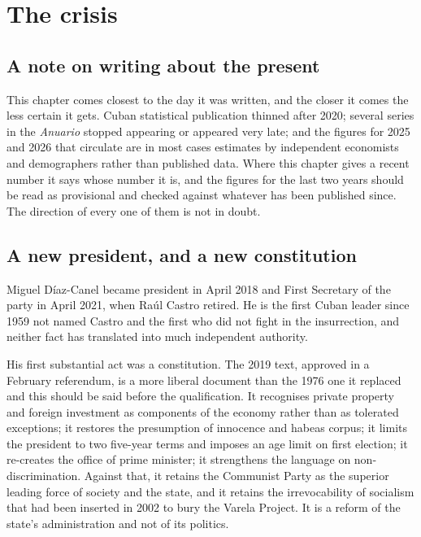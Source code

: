 \chapter{The crisis}
\label{ch:crisis}

\section{A note on writing about the present}

This chapter comes closest to the day it was written, and the closer it comes
the less certain it gets. Cuban statistical publication thinned after 2020;
several series in the \emph{Anuario} stopped appearing or appeared very late;
and the figures for 2025 and 2026 that circulate are in most cases estimates by
independent economists and demographers rather than published data. Where this
chapter gives a recent number it says whose number it is, and the figures for
the last two years should be read as provisional and checked against whatever
has been published since. The direction of every one of them is not in doubt.

\section{A new president, and a new constitution}

Miguel D\'iaz-Canel became president in April 2018 and First Secretary of the
party in April 2021, when Ra\'ul Castro retired. He is the first Cuban leader
since 1959 not named Castro and the first who did not fight in the
insurrection, and neither fact has translated into much independent authority.

His first substantial act was a constitution. The 2019 text, approved in a
February referendum, is a more liberal document than the 1976 one it replaced
and this should be said before the qualification. It recognises private
property and foreign investment as components of the economy rather than as
tolerated exceptions; it restores the presumption of innocence and habeas
corpus; it limits the president to two five-year terms and imposes an age limit
on first election; it re-creates the office of prime minister; it strengthens
the language on non-discrimination. Against that, it retains the Communist
Party as the superior leading force of society and the state, and it retains
the irrevocability of socialism that had been inserted in 2002 to bury the
Varela Project. It is a reform of the state's administration and not of its
politics.

